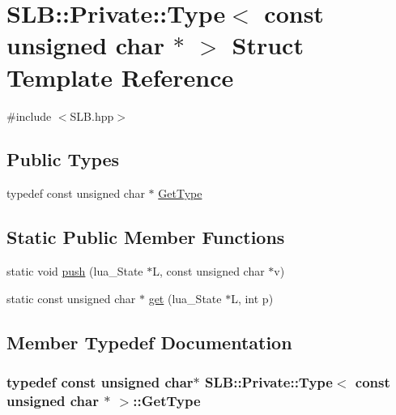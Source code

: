\hypertarget{structSLB_1_1Private_1_1Type_3_01const_01unsigned_01char_01_5_01_4}{}\section{S\+LB\+:\+:Private\+:\+:Type$<$ const unsigned char $\ast$ $>$ Struct Template Reference}
\label{structSLB_1_1Private_1_1Type_3_01const_01unsigned_01char_01_5_01_4}


{\ttfamily \#include $<$S\+L\+B.\+hpp$>$}

\subsection*{Public Types}
\begin{DoxyCompactItemize}
\item 
typedef const unsigned char $\ast$ \hyperlink{structSLB_1_1Private_1_1Type_3_01const_01unsigned_01char_01_5_01_4_ae348860661fd16939838f50eb1da6840}{Get\+Type}
\end{DoxyCompactItemize}
\subsection*{Static Public Member Functions}
\begin{DoxyCompactItemize}
\item 
static void \hyperlink{structSLB_1_1Private_1_1Type_3_01const_01unsigned_01char_01_5_01_4_ab8a9e49e9998473c8b490d84999e457b}{push} (lua\+\_\+\+State $\ast$L, const unsigned char $\ast$v)
\item 
static const unsigned char $\ast$ \hyperlink{structSLB_1_1Private_1_1Type_3_01const_01unsigned_01char_01_5_01_4_aa6578665e78017f96d0f86d93a8a71d7}{get} (lua\+\_\+\+State $\ast$L, int p)
\end{DoxyCompactItemize}


\subsection{Member Typedef Documentation}
\subsubsection[{\texorpdfstring{Get\+Type}{GetType}}]{\setlength{\rightskip}{0pt plus 5cm}typedef const unsigned char$\ast$ {\bf S\+L\+B\+::\+Private\+::\+Type}$<$ const unsigned char $\ast$ $>$\+::{\bf Get\+Type}}\hypertarget{structSLB_1_1Private_1_1Type_3_01const_01unsigned_01char_01_5_01_4_ae348860661fd16939838f50eb1da6840}{}\label{structSLB_1_1Private_1_1Type_3_01const_01unsigned_01char_01_5_01_4_ae348860661fd16939838f50eb1da6840}


